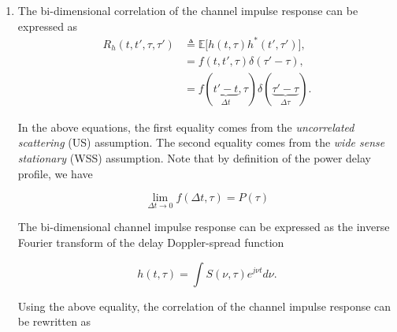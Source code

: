 \documentclass [a4paper, 11pt] {article}
\begin{document}
   \begin{solution}
       \begin{enumerate}
            \item The bi-dimensional correlation of the channel impulse response can be expressed as 
            \begin{align}
                R_h(t,t',\tau,\tau') &\triangleq \mathbb{E}\Big[h(t,\tau)h^*(t',\tau')\Big],\\
                &= f(t,t',\tau)\delta(\tau'-\tau),\\
                &= f(\underbrace{t'-t}_{\Delta t},\tau)\delta(\underbrace{\tau'-\tau}_{\Delta \tau }).
            \end{align}
            
            In the above equations, the first equality comes from the \textit{uncorrelated scattering} (US) assumption. The second equality comes from the \textit{wide sense stationary} (WSS) assumption. Note that by definition of the power delay profile, we have 
            
            \begin{equation*}
                \lim_{\Delta t \rightarrow 0} f(\Delta t, \tau) = P(\tau)
            \end{equation*}
            
            The bi-dimensional channel impulse response can be expressed as the inverse Fourier transform of the delay Doppler-spread function 
            
            \begin{equation}
                h(t,\tau) =\int S(\nu,\tau)e^{j\nu t}d\nu.
            \end{equation}
            
            Using the above equality, the correlation of the channel impulse response can be rewritten as 
            

\end{enumerate}
\end{solution}
\end{document}
